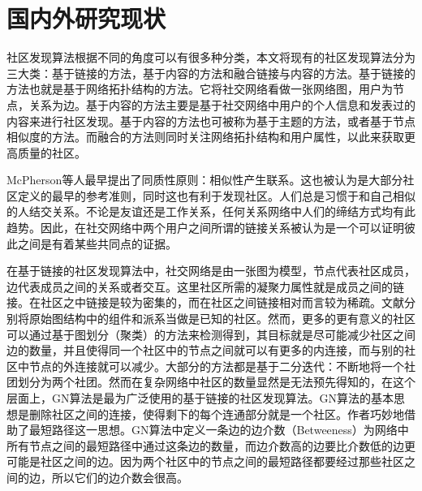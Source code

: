 \section{国内外研究现状}
社区发现算法根据不同的角度可以有很多种分类，本文将现有的社区发现算法分为三大类：基于链接的方法，基于内容的方法和融合链接与内容的方法。基于链接的方法也就是基于网络拓扑结构的方法。它将社交网络看做一张网络图，用户为节点，关系为边。基于内容的方法主要是基于社交网络中用户的个人信息和发表过的内容来进行社区发现。基于内容的方法也可被称为基于主题的方法，或者基于节点相似度的方法。而融合的方法则同时关注网络拓扑结构和用户属性，以此来获取更高质量的社区。

McPherson等人最早提出了同质性原则：相似性产生联系\cite{Mcpherson2001Birds}。这也被认为是大部分社区定义的最早的参考准则，同时这也有利于发现社区。人们总是习惯于和自己相似的人结交关系。不论是友谊还是工作关系，任何关系网络中人们的缔结方式均有此趋势。因此，在社交网络中两个用户之间所谓的链接关系被认为是一个可以证明彼此之间是有着某些共同点的证据。

在基于链接的社区发现算法中，社交网络是由一张图为模型，节点代表社区成员，边代表成员之间的关系或者交互。这里社区所需的凝聚力属性就是成员之间的链接。在社区之中链接是较为密集的，而在社区之间链接相对而言较为稀疏。文献\cite{Fortunato2009Community}分别将原始图结构中的组件和派系当做是已知的社区。然而，更多的更有意义的社区可以通过基于图划分（聚类）的方法来检测得到，其目标就是尽可能减少社区之间边的数量，并且使得同一个社区中的节点之间就可以有更多的内连接，而与别的社区中节点的外连接就可以减少。大部分的方法都是基于二分迭代：不断地将一个社团划分为两个社团。然而在复杂网络中社区的数量显然是无法预先得知的，在这个层面上，GN算法\cite{2002Community}是最为广泛使用的基于链接的社区发现算法。GN算法的基本思想是删除社区之间的连接，使得剩下的每个连通部分就是一个社区。作者巧妙地借助了最短路径这一思想。GN算法中定义一条边的边介数（Betweeness）为网络中所有节点之间的最短路径中通过这条边的数量，而边介数高的边要比介数低的边更可能是社区之间的边。因为两个社区中的节点之间的最短路径都要经过那些社区之间的边，所以它们的边介数会很高。

